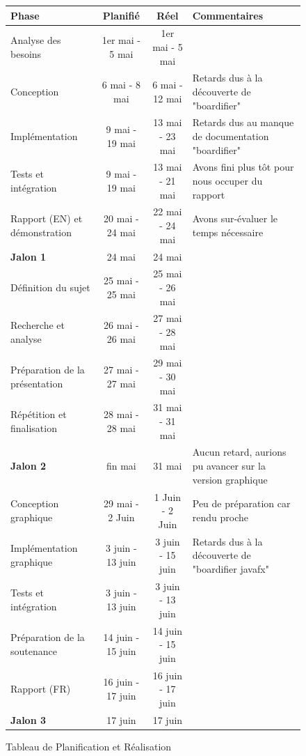 \begin{figure}[!h]
    \begin{tabularx}{\textwidth}{|X|c|c|X|}
        \hline
        \textbf{Phase} & \textbf{Planifié} & \textbf{Réel} & \textbf{Commentaires} \\
        \hline
        Analyse des besoins & 1er mai - 5 mai & 1er mai - 5 mai & \\
        \hline
        Conception & 6 mai - 8 mai & 6 mai - 12 mai & Retards dus à la découverte de "boardifier" \\
        \hline
        Implémentation & 9 mai - 19 mai & 13 mai - 23 mai & Retards dus au manque de documentation "boardifier" \\
        \hline
        Tests et intégration & 9 mai - 19 mai & 13 mai - 21 mai  & Avons fini plus tôt pour nous occuper du rapport \\
        \hline
        Rapport (EN) et démonstration & 20 mai - 24 mai & 22 mai - 24 mai & Avons sur-évaluer le temps nécessaire \\
        \hline
        \textbf{Jalon 1} & 24 mai & 24 mai & \\
        \hline
        Définition du sujet & 25 mai - 25 mai & 25 mai - 26 mai & \\
        \hline
        Recherche et analyse & 26 mai - 26 mai & 27 mai - 28 mai  & \\
        \hline
        Préparation de la présentation & 27 mai - 27 mai & 29 mai - 30 mai &  \\
        \hline
        Répétition et finalisation & 28 mai - 28 mai & 31 mai - 31 mai  & \\
        \hline
        \textbf{Jalon 2} & fin mai & 31 mai  & Aucun retard, aurions pu avancer sur la version graphique \\
        \hline
        Conception graphique & 29 mai - 2 Juin & 1 Juin - 2 Juin & Peu de préparation car rendu proche \\
        \hline
        Implémentation graphique & 3 juin - 13 juin & 3 juin - 15 juin  & Retards dus à la découverte de "boardifier javafx" \\
        \hline
        Tests et intégration & 3 juin - 13 juin & 3 juin - 13 juin  & \\
        \hline
        Préparation de la soutenance & 14 juin - 15 juin & 14 juin - 15 juin  & \\
        \hline
        Rapport (FR) & 16 juin - 17 juin & 16 juin - 17 juin & \\
        \hline
        \textbf{Jalon 3} & 17 juin & 17 juin &\\
        \hline
    \end{tabularx}
    \caption{Tableau de Planification et Réalisation}
\end{figure}

